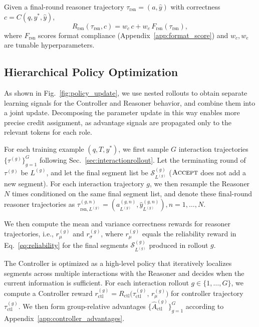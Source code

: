Given a final-round reasoner trajectory $\tau_{\text{rsn}}=(a,\hat{y})$ with correctness $c=C(q,y^*,\hat{y})$,
\begin{equation}
R_{\text{rsn}}(\tau_{\text{rsn}}, c) = w_c\,c + w_e\,F_{\text{rsn}}(\tau_{\text{rsn}}),
\label{eq:rsn-reward}
\end{equation}
where $F_{\text{rsn}}$ scores format compliance (Appendix~\ref{app:format_score}) and $w_c, w_e$ are tunable hyperparameters.


\subsection{Hierarchical Policy Optimization}
\label{sec:policyoptimization}

As shown in Fig.~\ref{fig:policy_update}, we use nested rollouts to obtain separate learning signals for the Controller and Reasoner behavior, and combine them into a joint update. Decomposing the parameter update in this way enables more precise credit assignment, as advantage signals are propagated only to the relevant tokens for each role.

For each training example $(q,T,y^*)$, we first sample $G$ interaction trajectories
$\{\tau^{(g)}\}_{g=1}^{G}$ following Sec.~\ref{sec:interactionrollout}.
Let the terminating round of $\tau^{(g)}$ be $L^{(g)}$, and let the final segment list be $\mathcal{S}^{(g)}_{L^{(g)}}$
($\textsc{Accept}$ does not add a new segment).
For each interaction trajectory $g$, we then resample the Reasoner $N$ times conditioned on the same final segment list, and denote these final-round reasoner trajectories as
$\tau_{\text{rsn},L^{(g)}}^{(g,n)}=(a_{L^{(g)}}^{(g,n)},\hat{y}_{L^{(g)}}^{(g,n)}), n=1,\dots,N$.

We then compute the mean and variance correctness rewards for reasoner trajectories, i.e., $r_\mu^{(g)}$ and $r_\sigma^{(g)}$, where $r_\mu^{(g)}$ equals the reliability reward in Eq.~\eqref{eq:reliability} for the final segments $\mathcal{S}^{(g)}_{L^{(g)}}$ produced in rollout $g$.


The Controller is optimized as a high-level policy that iteratively localizes segments across multiple interactions with the Reasoner and decides when the current information is sufficient.
For each interaction rollout $g\in\{1,\dots,G\}$, we compute a Controller reward
$r_{\text{ctl}}^{(g)}= R_{\text{ctl}}\!\bigl(\tau_{\text{ctl}}^{(g)},\, r_\mu^{(g)}\bigr)$ for controller trajectory $\tau_{\text{ctl}}^{(g)}$.
We then form group-relative advantages
$\{\hat{A}_{\text{ctl}}^{(g)}\}_{g=1}^G$ according to Appendix~\ref{app:controller_advantages}.

